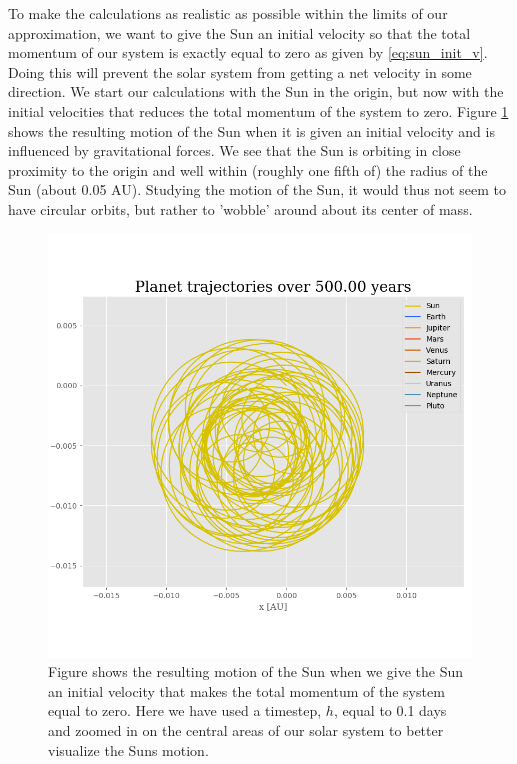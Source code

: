 \documentclass[12pt]{article}
\numberwithin{figure}{section}
\numberwithin{table}{section}
\begin{document}
\noindent To make the calculations as realistic as possible within the limits of our approximation, we want to give the Sun an initial velocity so that the total momentum of our system is exactly equal to zero as given by \eqref{eq:sun_init_v}. Doing this will prevent the solar system from getting a net velocity in some direction. We start our calculations with the Sun in the origin, but now with the initial velocities that reduces the total momentum of the system to zero. Figure \ref{fig:sun_osci} shows the resulting motion of the Sun when it is given an initial velocity and is influenced by gravitational forces. We see that the Sun is orbiting in close proximity to the origin and well within (roughly one fifth of) the radius of the Sun (about 0.05 AU). Studying the motion of the Sun, it would thus not seem to have circular orbits, but rather to 'wobble' around about its center of mass. \\

\begin{figure}[ht]
 \centerline{\includegraphics[scale = 0.6]{sun_oscillations.png}}
 \caption{ Figure shows the resulting motion of the Sun when we give the Sun an initial velocity that makes the total  momentum of the system equal to zero. Here we have used a timestep, $h$, equal to 0.1 days and zoomed in on the central areas of our solar system to better visualize the Suns motion.}
 \label{fig:sun_osci}
\end{figure}
\end{document}
